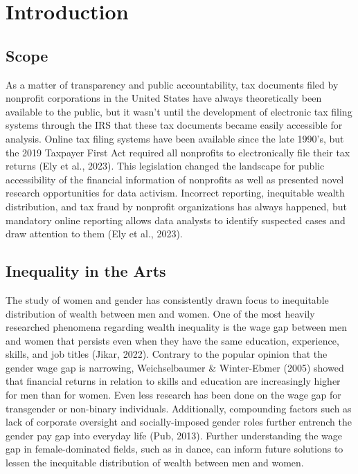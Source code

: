 \documentclass[Dance Data
Project,article,submit,moreauthors,pdftex]{mdpi}
\begin{document}

\hypertarget{introduction}{%
\section{Introduction}\label{introduction}}

\hypertarget{scope}{%
\subsection{Scope}\label{scope}}

As a matter of transparency and public accountability, tax documents
filed by nonprofit corporations in the United States have always
theoretically been available to the public, but it wasn't until the
development of electronic tax filing systems through the IRS that these
tax documents became easily accessible for analysis. Online tax filing
systems have been available since the late 1990's, but the 2019 Taxpayer
First Act required all nonprofits to electronically file their tax
returns (Ely et al., 2023). This legislation changed the landscape for
public accessibility of the financial information of nonprofits as well
as presented novel research opportunities for data activism. Incorrect
reporting, inequitable wealth distribution, and tax fraud by nonprofit
organizations has always happened, but mandatory online reporting allows
data analysts to identify suspected cases and draw attention to them
(Ely et al., 2023).

\hypertarget{inequality-in-the-arts}{%
\subsection{Inequality in the Arts}\label{inequality-in-the-arts}}

The study of women and gender has consistently drawn focus to
inequitable distribution of wealth between men and women. One of the
most heavily researched phenomena regarding wealth inequality is the
wage gap between men and women that persists even when they have the
same education, experience, skills, and job titles (Jikar, 2022).
Contrary to the popular opinion that the gender wage gap is narrowing,
Weichselbaumer \& Winter-Ebmer (2005) showed that financial returns in
relation to skills and education are increasingly higher for men than
for women. Even less research has been done on the wage gap for
transgender or non-binary individuals. Additionally, compounding factors
such as lack of corporate oversight and socially-imposed gender roles
further entrench the gender pay gap into everyday life (Pub, 2013).
Further understanding the wage gap in female-dominated fields, such as
in dance, can inform future solutions to lessen the inequitable
distribution of wealth between men and women.
\end{document}
